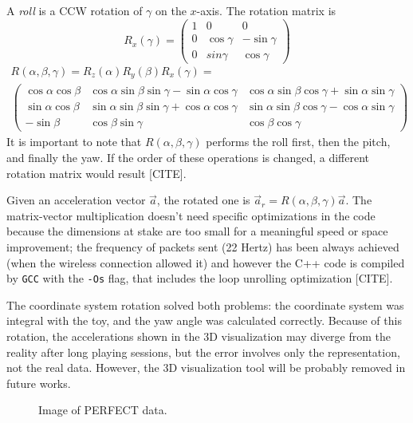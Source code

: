 A \textit{roll} is a CCW rotation of $\gamma$ on the $x$-axis. The rotation matrix is
\[
	R_x(\gamma) =
	\begin{pmatrix}
		1 & 0 & 0 \\
		0 & \cos\gamma & -\sin\gamma \\
		0 & sin\gamma & \cos\gamma
	\end{pmatrix}
\]
\begin{gather*}
	R(\alpha, \beta, \gamma) = R_z(\alpha) R_y(\beta) R_x(\gamma) = \\
	\begin{pmatrix}
		\cos\alpha \cos\beta & \cos\alpha \sin\beta \sin\gamma - \sin\alpha \cos\gamma & \cos\alpha \sin\beta \cos\gamma + \sin\alpha \sin\gamma \\
		\sin\alpha \cos\beta & \sin\alpha \sin\beta \sin\gamma + \cos\alpha \cos\gamma & \sin\alpha \sin\beta \cos\gamma - \cos\alpha \sin\gamma \\
		-\sin\beta & \cos\beta \sin\gamma & \cos\beta \cos\gamma
	\end{pmatrix}
\end{gather*}
It is important to note that $R(\alpha, \beta, \gamma)$ performs the roll first, then the pitch, and finally the yaw. If the order of these operations is changed, a different rotation matrix would result [CITE].
\bigbreak

Given an acceleration vector $\vec a$, the rotated one is $\vec a_r = R(\alpha, \beta, \gamma) \vec a$.
The matrix-vector multiplication doesn't need specific optimizations in the code because the dimensions at stake are too small for a meaningful speed or space improvement; the frequency of packets sent (22 Hertz) has been always achieved (when the wireless connection allowed it) and however the C++ code is compiled by \texttt{GCC} with the \texttt{-Os} flag, that includes the loop unrolling optimization [CITE].
\bigbreak

The coordinate system rotation solved both problems: the coordinate system was integral with the toy, and the yaw angle was calculated correctly. Because of this rotation, the accelerations shown in the 3D visualization may diverge from the reality after long playing sessions, but the error involves only the representation, not the real data. However, the 3D visualization tool will be probably removed in future works.
\bigbreak

\begin{center}
	\begin{figure}[ht!]
		\caption{Image of PERFECT data.}
	\end{figure}
\end{center}

